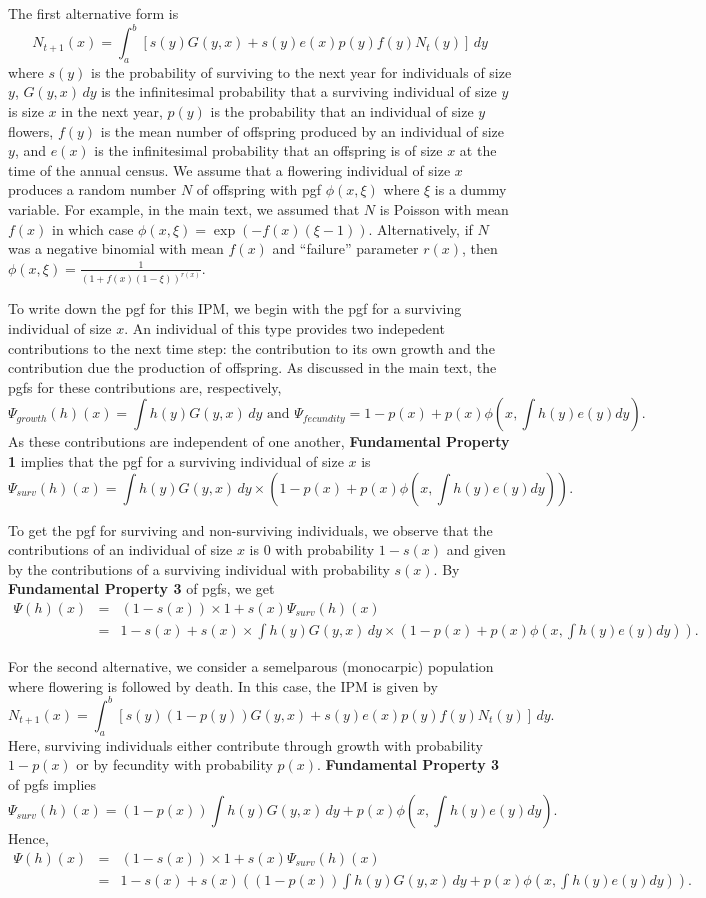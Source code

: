\documentclass[12pt]{amsart}\usepackage[]{graphicx}\usepackage[]{color}
\begin{document}
The first alternative form is 
\[
N_{t+1}(x)=\int_a^b \left[ s(y)G(y, x)+s(y)e(x)p(y)f(y)N_t(y)\right]\, dy
\]
where $s(y)$ is the probability of surviving to the next year for individuals of size $y$, $G(y, x) \, dy$ is the infinitesimal probability that a surviving individual of size $y$ is size $x$ in the next year, $p(y)$ is the probability that an individual of size $y$ flowers, $f(y)$ is the mean number of offspring produced by an individual of size $y$, and $e(x)$ is the infinitesimal probability that an offspring is of size $x$ at the time of the annual census. We assume that a flowering individual of size $x$ produces a random number $N$ of offspring with pgf $\phi(x,\xi)$ where $\xi$ is a dummy variable. For example, in the main text, we assumed that $N$ is Poisson with mean $f(x)$ in which case $\phi(x, \xi)=\exp(-f(x)(\xi-1))$. Alternatively, if $N$ was a negative binomial with mean $f(x)$ and ``failure'' parameter $r(x)$, then $\phi(x,\xi)=\frac{1}{(1+f(x)(1-\xi))^{r(x)}}$.

To write down the pgf for this IPM, we begin with the pgf for a surviving individual of size $x$. An individual of this type provides two indepedent contributions to the next time step: the contribution to its own growth and the contribution due the production of offspring. As discussed in the main text, the pgfs for these contributions are, respectively, 
\[
\Psi_{growth}(h)(x)=\int h(y) G(y,x)\,dy \mbox{ and } \Psi_{fecundity}=1-p(x)+p(x)\phi(x,\int h(y)e(y)dy).
\]
As these contributions are independent of one another, \textbf{Fundamental Property 1} implies that the pgf for a surviving individual of size $x$ is  
\[
\Psi_{surv}(h)(x)=\int h(y) G(y,x)\,dy \times \left(1-p(x)+p(x)\phi(x,\int h(y)e(y)dy)\right). 
\]

To get the pgf for surviving and non-surviving individuals, we observe that the contributions of an individual of size $x$ is $0$ with probability $1-s(x)$ and given by the contributions of a surviving individual with probability $s(x)$. By \textbf{Fundamental Property 3} of pgfs, we get 
\begin{eqnarray*}
\Psi (h)(x)&=&(1-s(x))\times 1+s(x)\Psi_{surv}(h)(x)\\
&=& 1-s(x)+s(x)\times \int h(y) G(y,x)\,dy \times \left(1-p(x)+p(x)\phi(x,\int h(y)e(y)dy)\right).
\end{eqnarray*}

For the second alternative, we consider a semelparous (monocarpic) population where flowering is followed by death. In this case, the IPM is given by 
\[
N_{t+1}(x)=\int_a^b \left[ s(y)(1-p(y))G(y, x)+s(y)e(x)p(y)f(y)N_t(y)\right]\, dy.
\]
Here, surviving individuals either contribute through growth with probability $1-p(x)$ or by fecundity with probability $p(x)$. \textbf{Fundamental Property 3} of pgfs implies 
\[
\Psi_{surv}(h)(x)=(1-p(x))\int h(y) G(y,x)\,dy +p(x)\phi(x,\int h(y)e(y)dy). 
\]
Hence, 
\begin{eqnarray*}
\Psi (h)(x)&=&(1-s(x))\times 1 +s(x)\Psi_{surv}(h)(x)\\
&=& 1-s(x) + s(x)\left((1-p(x))\int h(y) G(y,x)\,dy +p(x)\phi(x,\int h(y)e(y)dy)\right). 
\end{eqnarray*}
\end{document}

